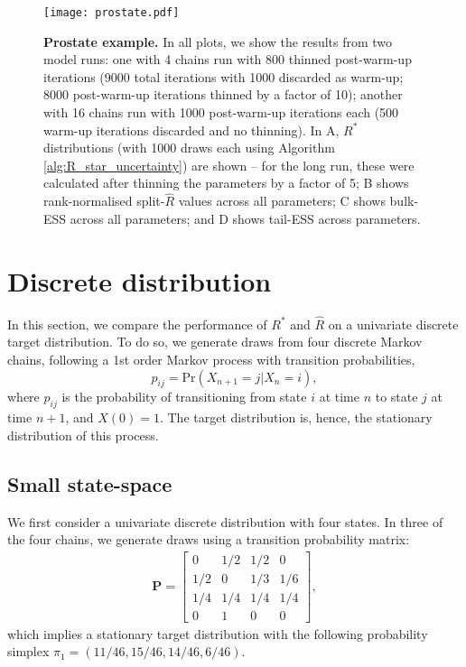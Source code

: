 \documentclass{article}
\begin{document}
\begin{figure}[!htb]
	\centerline{\texttt{[image: prostate.pdf]}}
	\caption{\textbf{Prostate example.} In all plots, we show the results from two model runs: one with 4 chains run with 800 thinned post-warm-up iterations (9000 total iterations with 1000 discarded as warm-up; 8000 post-warm-up iterations thinned by a factor of 10); another with 16 chains run with 1000 post-warm-up iterations each (500 warm-up iterations discarded and no thinning). In A, $R^*$ distributions (with 1000 draws each using Algorithm \ref{alg:R_star_uncertainty}) are shown -- for the long run, these were calculated after thinning the parameters by a factor of 5; B shows rank-normalised split-$\widehat{R}$ values across all parameters; C shows bulk-ESS across all parameters; and D shows tail-ESS across parameters.}
	\label{fig:prostate}
\end{figure}

\color{red}
\section{Discrete distribution}\label{sec:discrete}
In this section, we compare the performance of $R^*$ and $\widehat{R}$ on a univariate discrete target distribution. To do so, we generate draws from four discrete Markov chains, following a 1st order Markov process with transition probabilities,
%
\begin{equation}
p_{ij} = \text{Pr}(X_{n+1}=j|X_n=i),
\end{equation}
%
where $p_{ij}$ is the probability of transitioning from state $i$ at time $n$ to state $j$ at time $n+1$, and $X(0)=1$. The target distribution is, hence, the stationary distribution of this process.

\subsection{Small state-space}\label{sec:discrete_small}
We first consider a univariate discrete distribution with four states. In three of the four chains, we generate draws using a transition probability matrix:
%
\begin{gather}
\boldsymbol{P}
=
\begin{bmatrix}
0 & 1/2 & 1/2 & 0\\
1/2 & 0 & 1/3 & 1/6\\
1/4 & 1/4 & 1/4 & 1/4\\
0 & 1 & 0 & 0
\end{bmatrix},
\end{gather}
%
which implies a stationary target distribution with the following probability simplex $\pi_1 = (11/46, 15/46, 14/46, 6/46)$.
\end{document}
